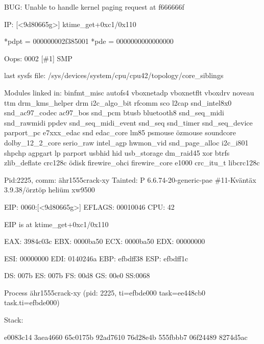 \begin{tiny}
\begin{ttfamily}

\noindent [376730.313461] BUG: Unable to handle kernel paging request at f666666f

\noindent [376730.313461] IP: [\textless{}9d80665g\textgreater{}] ktime\_get+0xc1/0x110

\noindent [376730.313461] *pdpt = 000000002f385001 *pde = 0000000000000000

\noindent [376730.313461] Oops: 0002 [\#1] SMP

\noindent [376730.313461] last sysfs file: /sys/devices/system/cpu/cpu42/topology/core\_siblings

\noindent [376730.313461] Modules linked in: binfmt\_misc autofs4 vboxnetadp vboxnetflt vboxdrv noveau ttm drm\_kms\_helper drm i2c\_algo\_bit rfcomm sco l2cap snd\_intel8x0 snd\_ac97\_codec ac97\_bos snd\_pcm btusb bluetooth8 snd\_seq\_midi snd\_rawmidi ppdev snd\_seq\_midi\_event snd\_seq snd\_timer snd\_seq\_device parport\_pc e7xxx\_edac snd edac\_core lm85 psmouse özmouse soundcore dolby\_12\_2\_core serio\_raw intel\_agp hwmon\_vid snd\_page\_alloc i2c\_i801 shpchp agpgart lp parport usbhid hid usb\_storage dm\_raid45 xor btrfs zlib\_deflate crc128c ödisk firewire\_ohci firewire\_core e1000 crc\_itu\_t libcrc128c

\noindent [376730.313461]

\noindent [376730.313461] Pid:2225, comm: ähr1555crack-xy Tainted: P              6.6.74-20-generic-pae \#11-Kväntäx 3.9.38/örztöp heliüm xw9500

\noindent [376730.313461] EIP: 0060:[\textless{}9d80665g\textgreater{}] EFLAGS: 00010046 CPU: 42

\noindent [376730.313461] EIP is at ktime\_get+0xc1/0x110

\noindent [376730.313461] EAX: 3984c03c EBX: 0000ba50 ECX: 0000ba50 EDX: 00000000

\noindent [376730.313461] ESI: 00000000 EDI: 0140246a EBP: efbdff38 ESP: efbdff1c

\noindent [376730.313461]  DS: 007b ES: 007b FS: 00d8 GS: 00e0 SS:0068

\noindent [376730.313461] Process ähr1555crack-xy (pid: 2225, ti=efbde000 task=ee448cb0 task.ti=efbde000)

\noindent [376730.313461] Stack:

\noindent [376730.313461]  e0083c14 3aea4660 65c0175b 92ad7610 76d28e4b 555fbbb7 06f24489 8274d5ac


\end{ttfamily}
\end{tiny}
